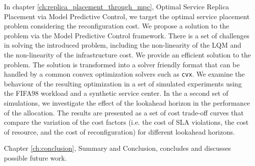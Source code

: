  In chapter \ref{ch:replica_placement_through_mpc}, Optimal Service Replica Placement via Model Predictive Control, we target the optimal service placement problem considering the reconfiguration cost. We propose a solution to the problem via the Model Predictive Control framework.  
There is a set of challenges in solving the introduced problem, including the non-linearity of the LQM and the non-linearity of the infrastructure cost. We provide an efficient solution to the problem. The solution is transformed into a solver friendly format that can be handled by a common convex optimization solvers such as \texttt{cvx}.
We examine the behaviour of the resulting optimization in a set of simulated experiments using the FIFA98 workload and a synthetic service center. In the a second set of simulations, we investigate the effect of the lookahead horizon in the performance of the allocation. The results are presented as a set of cost trade-off curves that compare the variation of the cost factors (i.e. the cost of SLA violations, the cost of resource, and the cost of reconfiguration) for different lookahead horizons.

  Chapter \ref{ch:conclusion}, Summary and Conclusion, concludes and discusses possible future work.      




